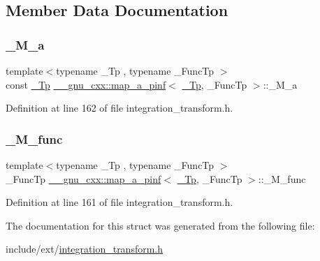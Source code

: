 \subsection{Member Data Documentation}
\mbox{\label{struct____gnu__cxx_1_1map__a__pinf_a1de7ffe1b5ac3d528cb472ced4878f27}} 
\subsubsection{\texorpdfstring{\+\_\+\+M\+\_\+a}{\_M\_a}}
{\footnotesize\ttfamily template$<$typename \+\_\+\+Tp , typename \+\_\+\+Func\+Tp $>$ \\
const \hyperlink{namespace____gnu__cxx_a3b19a9c800ca194374ef9172290f7d79}{\+\_\+\+Tp} \hyperlink{struct____gnu__cxx_1_1map__a__pinf}{\+\_\+\+\_\+gnu\+\_\+cxx\+::map\+\_\+a\+\_\+pinf}$<$ \hyperlink{namespace____gnu__cxx_a3b19a9c800ca194374ef9172290f7d79}{\+\_\+\+Tp}, \+\_\+\+Func\+Tp $>$\+::\+\_\+\+M\+\_\+a}



Definition at line 162 of file integration\+\_\+transform.\+h.

\mbox{\label{struct____gnu__cxx_1_1map__a__pinf_a5e842585fa430caa329cb26a4976ee88}} 
\subsubsection{\texorpdfstring{\+\_\+\+M\+\_\+func}{\_M\_func}}
{\footnotesize\ttfamily template$<$typename \+\_\+\+Tp , typename \+\_\+\+Func\+Tp $>$ \\
\+\_\+\+Func\+Tp \hyperlink{struct____gnu__cxx_1_1map__a__pinf}{\+\_\+\+\_\+gnu\+\_\+cxx\+::map\+\_\+a\+\_\+pinf}$<$ \hyperlink{namespace____gnu__cxx_a3b19a9c800ca194374ef9172290f7d79}{\+\_\+\+Tp}, \+\_\+\+Func\+Tp $>$\+::\+\_\+\+M\+\_\+func}



Definition at line 161 of file integration\+\_\+transform.\+h.



The documentation for this struct was generated from the following file\+:\begin{DoxyCompactItemize}
\item 
include/ext/\hyperlink{integration__transform_8h}{integration\+\_\+transform.\+h}\end{DoxyCompactItemize}
